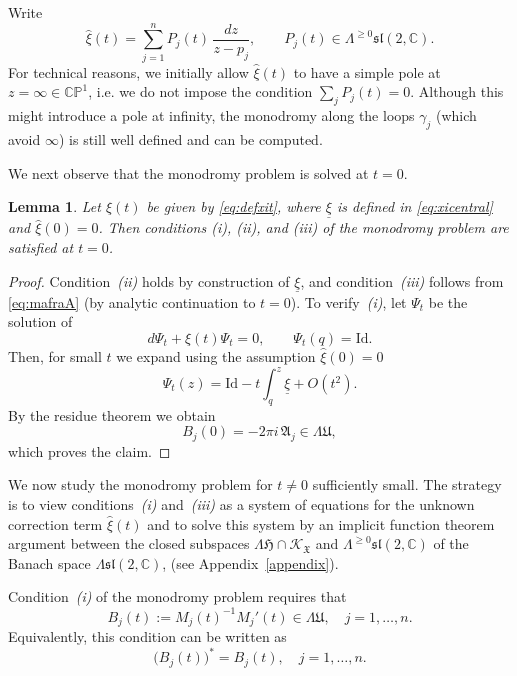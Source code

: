 \documentclass[12pt,a4paper]{amsart}
\newtheorem{lemma}[theorem]{Lemma}
\theoremstyle{definition}
\theoremstyle{remark}
\newcommand{\C}{\mathbb C}
\newcommand{\CP}{\mathbb{CP}}
\begin{document}
Write
\begin{equation}\label{eq:defhatxi}
\hat\xi(t)
=
\sum_{j=1}^n P_j(t)\,\frac{dz}{z-p_j},
\qquad
P_j(t)\in \Lambda^{\ge0}\mathfrak{sl}(2,\C).
\end{equation}
For technical reasons, we initially allow $\hat\xi(t)$ to have a simple pole at
$z=\infty\in\CP^1$, i.e. we do not impose the condition $\sum_j P_j(t)=0$.
Although this might introduce a pole at infinity, the monodromy along the loops $\gamma_j$ (which avoid $\infty$)
is still well defined and
can be computed.



We next observe that the monodromy problem is solved at $t=0.$
\begin{lemma}\label{lem:IFTt0}
Let $\xi(t)$ be given by \eqref{eq:defxit}, where $\underline\xi$ is defined in
\eqref{eq:xicentral} and $\hat\xi(0)=0$.
Then conditions \emph{(i)}, \emph{(ii)}, and \emph{(iii)} of the monodromy problem
are satisfied at $t=0$.
\end{lemma}

\begin{proof}
Condition~\emph{(ii)} holds by construction of $\underline\xi$, and
condition~\emph{(iii)} follows
from \eqref{eq:mafraA}
(by analytic continuation to $t=0$).
To verify~\emph{(i)}, let $\Psi_t$ be the solution of
\[
d\Psi_t+\xi(t)\Psi_t=0,
\qquad
\Psi_t(q)=\mathrm{Id}.
\]
Then, for small $t$ we expand using the assumption $\hat\xi(0)=0$
\[
\Psi_t(z)
=
\mathrm{Id}
-
t\int_q^z \underline\xi
+
O(t^2).
\]
By the residue theorem  we obtain
\[
B_j(0)=-2\pi i\,\mathfrak A_j\in\Lambda\mathfrak U,
\]
which proves the claim.
\end{proof}




We now study the monodromy problem for $t\neq 0$ sufficiently small.
The strategy is to view conditions~\emph{(i)} and~\emph{(iii)} as a system of equations
for the unknown correction term $\hat\xi(t)$ and to solve this system by an implicit
function theorem argument between the closed subspaces
$\Lambda\mathfrak H\cap \mathcal K_{\mathfrak X}$ and $\Lambda^{\geq0}\mathfrak{sl}(2,\C)$
 of  the Banach space
$\Lambda\mathfrak{sl}(2,\C)$,  (see Appendix~\ref{appendix}).

Condition~\emph{(i)} of the monodromy problem requires that
\begin{equation}\label{eq:difres}
B_j(t):=M_j(t)^{-1}M_j'(t)\in\Lambda\mathfrak U,
\quad j=1,\dots,n.
\end{equation}
Equivalently, this condition can be written as
\begin{equation}\label{eq:unitary-condition}
\bigl(B_j(t)\bigr)^* = B_j(t),
\quad j=1,\dots,n.
\end{equation}
\end{document}
